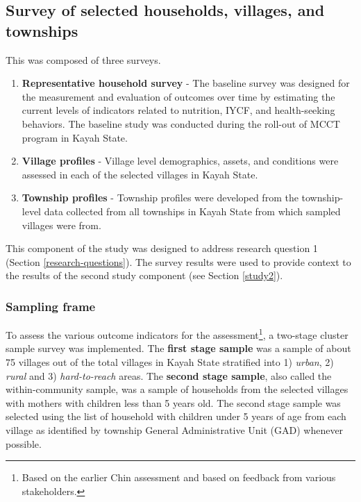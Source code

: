\documentclass[12pt,a4paper]{article}
\let\rmarkdownfootnote\footnote%
\def\footnote{\protect\rmarkdownfootnote}
\begin{document}
\hypertarget{study1}{%
\subsection{Survey of selected households, villages, and townships}\label{study1}}

This was composed of three surveys.

\begin{enumerate}
\def\labelenumi{\arabic{enumi}.}
\item
  \textbf{Representative household survey} - The baseline survey was designed for the measurement and evaluation of outcomes over time by estimating the current levels of indicators related to nutrition, IYCF, and health-seeking behaviors. The baseline study was conducted during the roll-out of MCCT program in Kayah State.
\item
  \textbf{Village profiles} - Village level demographics, assets, and conditions were assessed in each of the selected villages in Kayah State.
\item
  \textbf{Township profiles} - Township profiles were developed from the township-level data collected from all townships in Kayah State from which sampled villages were from.
\end{enumerate}

This component of the study was designed to address research question 1 (Section \ref{research-questions}). The survey results were used to provide context to the results of the second study component (see Section \ref{study2}).

\hypertarget{sampling-frame}{%
\subsubsection{Sampling frame}\label{sampling-frame}}

To assess the various outcome indicators for the assessment\footnote{Based on the earlier Chin assessment and based on feedback from various stakeholders.}, a two-stage cluster sample survey was implemented. The \textbf{first stage sample} was a sample of about 75 villages out of the total villages in Kayah State stratified into 1) \emph{urban}, 2) \emph{rural} and 3) \emph{hard-to-reach} areas. The \textbf{second stage sample}, also called the within-community sample, was a sample of households from the selected villages with mothers with children less than 5 years old. The second stage sample was selected using the list of household with children under 5 years of age from each village as identified by township General Administrative Unit (GAD) whenever possible.
\end{document}
